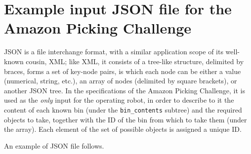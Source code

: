 \chapter{Example input JSON file for the Amazon Picking Challenge} \label{app:json}
JSON is a file interchange format, with a similar application scope of
its well-known cousin, XML; like XML, it consists of a tree-like
structure, delimited by braces, forms a set of key-node pairs, is which each node can be
either a value (numerical, string, etc.), an array of nodes (delimited
by square brackets), or another JSON tree. In the
specifications of the Amazon Picking Challenge, it is used as the
\emph{only} input for the operating robot, in order to describe to it the
content of each known bin (under the \texttt{bin\_contents} subtree) and
the required objects to take, together with the ID of the bin from
which to take them (under the  array). Each element of
the set of possible objects is assigned a unique ID.

An example of JSON file follows.

\paragraph{}
